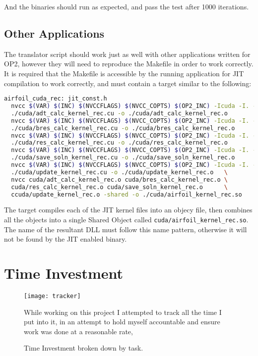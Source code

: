 \noindent And the binaries should run as expected, and pass the test after 1000 iterations.

\subsection{Other Applications}
The translator script should work just as well with other applications written for OP2, however they will need to reproduce the Makefile in order to work correctly. It is required that the Makefile is accessible by the running application for JIT compilation to work correctly, and must contain a target similar to the following:

\begin{lstlisting}[frame=none, backgroundcolor=\color{white}, language=bash]
airfoil_cuda_rec: jit_const.h
  nvcc $(VAR) $(INC) $(NVCCFLAGS) $(NVCC_COPTS) $(OP2_INC) -Icuda -I. -c \
  ./cuda/adt_calc_kernel_rec.cu -o ./cuda/adt_calc_kernel_rec.o
  nvcc $(VAR) $(INC) $(NVCCFLAGS) $(NVCC_COPTS) $(OP2_INC) -Icuda -I. -c \
  ./cuda/bres_calc_kernel_rec.cu -o ./cuda/bres_calc_kernel_rec.o
  nvcc $(VAR) $(INC) $(NVCCFLAGS) $(NVCC_COPTS) $(OP2_INC) -Icuda -I. -c \
  ./cuda/res_calc_kernel_rec.cu -o ./cuda/res_calc_kernel_rec.o
  nvcc $(VAR) $(INC) $(NVCCFLAGS) $(NVCC_COPTS) $(OP2_INC) -Icuda -I. -c \
  ./cuda/save_soln_kernel_rec.cu -o ./cuda/save_soln_kernel_rec.o
  nvcc $(VAR) $(INC) $(NVCCFLAGS) $(NVCC_COPTS) $(OP2_INC) -Icuda -I. -c \
  ./cuda/update_kernel_rec.cu -o ./cuda/update_kernel_rec.o   \
  nvcc cuda/adt_calc_kernel_rec.o cuda/bres_calc_kernel_rec.o \
  cuda/res_calc_kernel_rec.o cuda/save_soln_kernel_rec.o      \
  ccuda/update_kernel_rec.o -shared -o ./cuda/airfoil_kernel_rec.so
\end{lstlisting}

\noindent The target compiles each of the JIT kernel files into an objecy file, then combines all the objects into a single Shared Object called \verb|cuda/airfoil_kernel_rec.so|. The name of the resultant DLL must follow this name pattern, otherwise it will not be found by the JIT enabled binary.

\clearpage
\section{Time Investment}
\label{app:tracker}
\begin{figure}[h]
\texttt{[image: tracker]}
\caption{\label{fig:tracker}Time Investment broken down by task.}

\vspace{1em}
While working on this project I attempted to track all the time I put into it, in an attempt to hold myself accountable and ensure work was done at a reasonable rate,
\end{figure}
